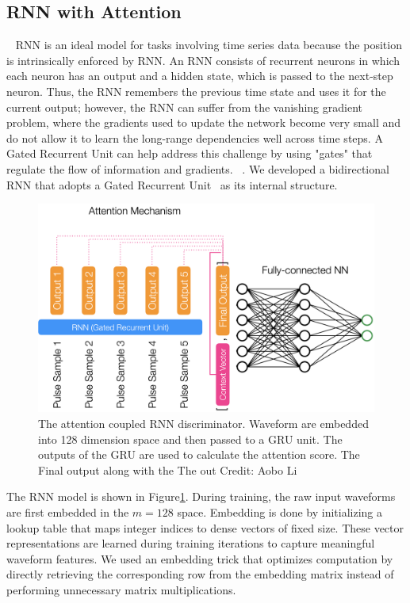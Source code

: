 \subsection{RNN with Attention}~\label{subapp:RNN}
RNN is an ideal model for tasks involving time series data because the position is intrinsically enforced by RNN. \cite{Rumelhart1986} An RNN consists of recurrent neurons in which each neuron has an output and a hidden state, which is passed to the next-step neuron. Thus, the RNN remembers the previous time state and uses it for the current output; however, the RNN can suffer from the vanishing gradient problem, where the gradients used to update the network become very small and do not allow it to learn the long-range dependencies well across time steps. A Gated Recurrent Unit can help address this challenge by using "gates" that regulate the flow of information and gradients. ~\cite{GRU}. We developed a bidirectional RNN that adopts a Gated Recurrent Unit~\cite{GRU} as its internal structure.


\begin{figure}[htb!]
    \centering
    \includegraphics[width=0.7\linewidth,trim={0pc 0pc 0pc 0pc},clip]{ch6/figs/rnnAttention.png}
    \caption{The attention coupled RNN discriminator. Waveform are embedded into 128 dimension space and then passed to a GRU unit. The outputs of the GRU are used to calculate the attention score. The Final output along with the   The out Credit: Aobo Li}
    \label{ch6_fig_detail_network}
\end{figure}

The RNN model is shown in Figure\ref{ch6_fig_detail_network}. During training, the raw input waveforms are first embedded in the $m=128$ space. Embedding is done by initializing a lookup table that maps integer indices to dense vectors of fixed size. These vector representations are learned during training iterations to capture meaningful waveform features. We used an embedding trick that optimizes computation by directly retrieving the corresponding row from the embedding matrix instead of performing unnecessary matrix multiplications. 

